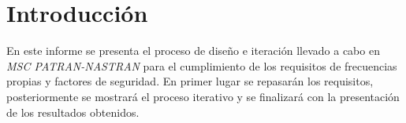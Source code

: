 \section{Introducción}

En este informe se presenta el proceso de diseño e iteración llevado a cabo en \textit{MSC PATRAN-NASTRAN} para el cumplimiento de los requisitos de frecuencias propias y factores de seguridad. En primer lugar se repasarán los requisitos, posteriormente se mostrará el proceso iterativo y se finalizará con la presentación de los resultados obtenidos.
